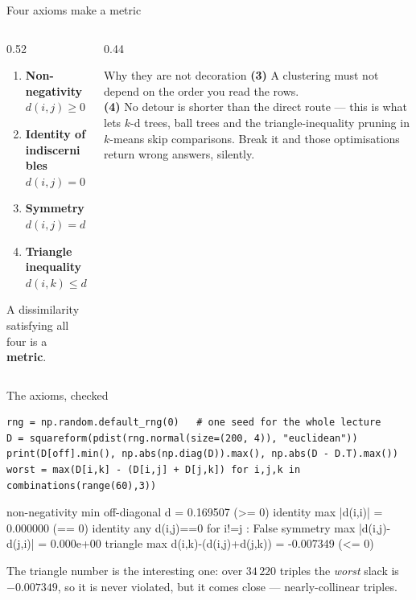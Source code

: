 \documentclass[aspectratio=169]{beamer}
\begin{document}
\begin{frame}{Four axioms make a metric}
  \begin{columns}[T]
    \begin{column}{0.52\textwidth}
      \begin{enumerate}
        \item \textbf{Non-negativity}\quad $d(i,j) \ge 0$
        \item \textbf{Identity of indiscernibles}\quad
          $d(i,j) = 0 \iff i = j$
        \item \textbf{Symmetry}\quad $d(i,j) = d(j,i)$
        \item \textbf{Triangle inequality}\quad
          $d(i,k) \le d(i,j) + d(j,k)$
      \end{enumerate}
      \vspace{0.4em}
      A dissimilarity satisfying all four is a \textbf{metric}.
    \end{column}
    \begin{column}{0.44\textwidth}
      \begin{alertblock}{Why they are not decoration}
        \textbf{(3)} A clustering must not depend on the order you read the
        rows.\\[0.3em]
        \textbf{(4)} No detour is shorter than the direct route --- this is
        what lets $k$-d trees, ball trees and the triangle-inequality
        pruning in $k$-means skip comparisons. Break it and those
        optimisations return wrong answers, silently.
      \end{alertblock}
    \end{column}
  \end{columns}
\end{frame}

\begin{frame}[fragile]{The axioms, checked}
\begin{lstlisting}
rng = np.random.default_rng(0)   # one seed for the whole lecture
D = squareform(pdist(rng.normal(size=(200, 4)), "euclidean"))
print(D[off].min(), np.abs(np.diag(D)).max(), np.abs(D - D.T).max())
worst = max(D[i,k] - (D[i,j] + D[j,k]) for i,j,k in combinations(range(60),3))
\end{lstlisting}
\begin{outblk}
non-negativity   min off-diagonal d = 0.169507  (>= 0)
identity         max |d(i,i)|        = 0.000000  (== 0)
identity         any d(i,j)==0 for i!=j : False
symmetry         max |d(i,j)-d(j,i)| = 0.000e+00
triangle         max d(i,k)-(d(i,j)+d(j,k)) = -0.007349  (<= 0)
\end{outblk}
  \begin{center}
    \small The triangle number is the interesting one: over $34\,220$
    triples the \emph{worst} slack is $-0.007349$, so it is never violated,
    but it comes close --- nearly-collinear triples.
  \end{center}
\end{frame}
\end{document}
